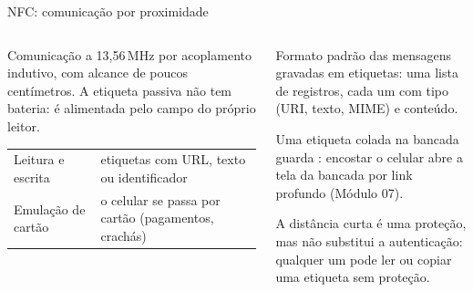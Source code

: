 \begin{frame}{NFC: comunicação por proximidade}
  \begin{columns}[T]
    \begin{column}{0.5\textwidth}
      \begin{definicao}[NFC]
        Comunicação a 13,56\,MHz por acoplamento indutivo, com alcance de poucos centímetros. A etiqueta passiva não tem bateria: é alimentada pelo campo do próprio leitor.
      \end{definicao}
      \scriptsize
      \begin{tabularx}{\linewidth}{@{}l L@{}}
        \toprule
         &  \\
        \midrule
        Leitura e escrita & etiquetas com URL, texto ou identificador \\
        Emulação de cartão & o celular se passa por cartão (pagamentos, crachás) \\
        \bottomrule
      \end{tabularx}
    \end{column}
    \begin{column}{0.48\textwidth}
      \begin{definicao}[NDEF]
        Formato padrão das mensagens gravadas em etiquetas: uma lista de registros, cada um com tipo (URI, texto, MIME) e conteúdo.
      \end{definicao}
      \begin{exemplo}[No LabMonitor]
        Uma etiqueta colada na bancada guarda : encostar o celular abre a tela da bancada por link profundo (Módulo 07).
      \end{exemplo}
      \begin{atencao}
        A distância curta é uma proteção, mas não substitui a autenticação: qualquer um pode ler ou copiar uma etiqueta sem proteção.
      \end{atencao}
    \end{column}
  \end{columns}
\end{frame}

